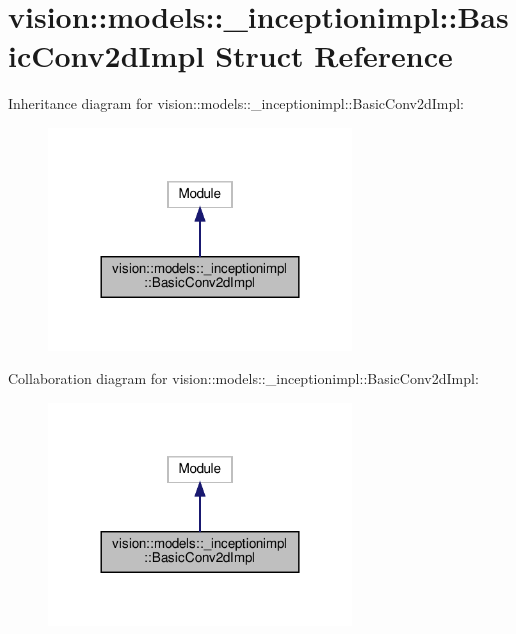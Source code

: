 \hypertarget{structvision_1_1models_1_1__inceptionimpl_1_1BasicConv2dImpl}{}\section{vision\+:\+:models\+:\+:\+\_\+inceptionimpl\+:\+:Basic\+Conv2d\+Impl Struct Reference}
\label{structvision_1_1models_1_1__inceptionimpl_1_1BasicConv2dImpl}


Inheritance diagram for vision\+:\+:models\+:\+:\+\_\+inceptionimpl\+:\+:Basic\+Conv2d\+Impl\+:
\nopagebreak
\begin{figure}[H]
\begin{center}
\leavevmode
\includegraphics[width=228pt]{structvision_1_1models_1_1__inceptionimpl_1_1BasicConv2dImpl__inherit__graph}
\end{center}
\end{figure}


Collaboration diagram for vision\+:\+:models\+:\+:\+\_\+inceptionimpl\+:\+:Basic\+Conv2d\+Impl\+:
\nopagebreak
\begin{figure}[H]
\begin{center}
\leavevmode
\includegraphics[width=228pt]{structvision_1_1models_1_1__inceptionimpl_1_1BasicConv2dImpl__coll__graph}
\end{center}
\end{figure}
